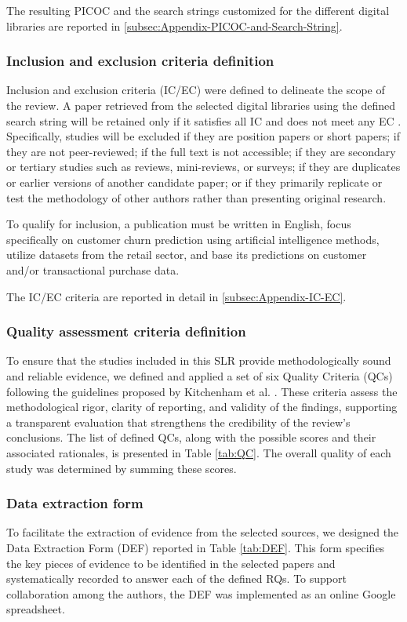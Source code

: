 The resulting PICOC and the search strings customized for the different digital libraries are reported in \ref{subsec:Appendix-PICOC-and-Search-String}.


\subsubsection{Inclusion and exclusion criteria definition}  
Inclusion and exclusion criteria (IC/EC) were defined to delineate the scope of the review. 
A paper retrieved from the selected digital libraries using the defined search string will be retained only if it satisfies all IC and does not meet any EC \cite{Kitchenham-Charters-guidelines}. Specifically, studies will be excluded if they are position papers or short papers; if they are not peer-reviewed; if the full text is not accessible; if they are secondary or tertiary studies such as reviews, mini-reviews, or surveys; if they are duplicates or earlier versions of another candidate paper; or if they primarily replicate or test the methodology of other authors rather than presenting original research. 

To qualify for inclusion, a publication must be written in English, focus specifically on customer churn prediction using artificial intelligence methods, utilize datasets from the retail sector, and base its predictions on customer and/or transactional purchase data.

The IC/EC criteria are reported in detail in \ref{subsec:Appendix-IC-EC}.


\subsubsection{Quality assessment criteria definition}
To ensure that the studies included in this SLR provide methodologically sound and reliable evidence, we defined and applied a set of six Quality Criteria (QCs) following the guidelines proposed by Kitchenham et al. \cite{SEGRESS_Kitchenham_2023}. These criteria assess the methodological rigor, clarity of reporting, and validity of the findings, supporting a transparent evaluation that strengthens the credibility of the review’s conclusions.
The list of defined QCs, along with the possible scores and their associated rationales, is presented in Table \ref{tab:QC}. The overall quality of each study was determined by summing these scores. 



\subsubsection{Data extraction form}\nopagebreak
To facilitate the extraction of evidence from the selected sources, we designed the Data Extraction Form (DEF) reported in Table \ref{tab:DEF}. This form specifies the key pieces of evidence to be identified in the selected papers and systematically recorded to answer each of the defined RQs. To support collaboration among the authors, the DEF was implemented as an online Google spreadsheet.

